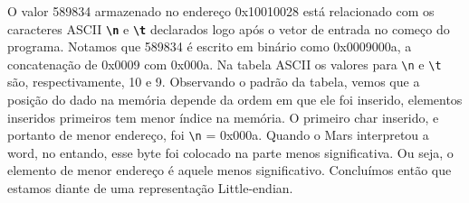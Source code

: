 \subsubsection{}

\newcommand*{\escape}[1]{\texttt{\textbackslash#1}}

\paragraph{}O valor 589834 armazenado no endereço 0x10010028 está relacionado com os 
caracteres ASCII \textbf{\escape{n}} e \textbf{\escape{t}} declarados logo após o vetor de
entrada no começo do programa. Notamos que 589834 é escrito em binário como
0x0009000a, a concatenação de 0x0009 com 0x000a.
Na tabela ASCII os valores para  \escape{n} e \escape{t} são, respectivamente, 10 e 9. Observando o padrão da tabela, vemos que a posição do dado na memória depende da ordem em que ele foi inserido, elementos inseridos primeiros tem menor índice na memória. O primeiro char inserido, e portanto de menor endereço, foi \escape{n} = 0x000a. Quando o Mars interpretou a word, no entando, esse byte foi colocado na parte menos significativa. Ou seja, o elemento de menor endereço é aquele menos significativo. 
Concluímos então que estamos diante de uma representação Little-endian.
\subsubsection{}

